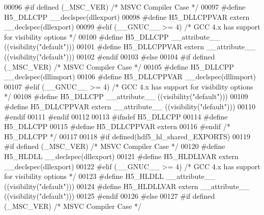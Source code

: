 \begin{DoxyCode}
00096 \textcolor{preprocessor}{  #if defined (\_MSC\_VER)  }\textcolor{comment}{/* MSVC Compiler Case */}\textcolor{preprocessor}{}
00097 \textcolor{preprocessor}{    #define H5\_DLLCPP \_\_declspec(dllexport)}
00098 \textcolor{preprocessor}{    #define H5\_DLLCPPVAR extern \_\_declspec(dllexport)}
00099 \textcolor{preprocessor}{  #elif (\_\_GNUC\_\_ >= 4)  }\textcolor{comment}{/* GCC 4.x has support for visibility options */}\textcolor{preprocessor}{}
00100 \textcolor{preprocessor}{    #define H5\_DLLCPP \_\_attribute\_\_ ((visibility("default")))}
00101 \textcolor{preprocessor}{    #define H5\_DLLCPPVAR extern \_\_attribute\_\_ ((visibility("default")))}
00102 \textcolor{preprocessor}{  #endif}
00103 \textcolor{preprocessor}{#else}
00104 \textcolor{preprocessor}{  #if defined (\_MSC\_VER)  }\textcolor{comment}{/* MSVC Compiler Case */}\textcolor{preprocessor}{}
00105 \textcolor{preprocessor}{    #define H5\_DLLCPP \_\_declspec(dllimport)}
00106 \textcolor{preprocessor}{    #define H5\_DLLCPPVAR \_\_declspec(dllimport)}
00107 \textcolor{preprocessor}{  #elif (\_\_GNUC\_\_ >= 4)  }\textcolor{comment}{/* GCC 4.x has support for visibility options */}\textcolor{preprocessor}{}
00108 \textcolor{preprocessor}{    #define H5\_DLLCPP \_\_attribute\_\_ ((visibility("default")))}
00109 \textcolor{preprocessor}{    #define H5\_DLLCPPVAR extern \_\_attribute\_\_ ((visibility("default")))}
00110 \textcolor{preprocessor}{  #endif}
00111 \textcolor{preprocessor}{#endif}
00112 
00113 \textcolor{preprocessor}{#ifndef H5\_DLLCPP}
00114 \textcolor{preprocessor}{  #define H5\_DLLCPP}
00115 \textcolor{preprocessor}{  #define H5\_DLLCPPVAR extern}
00116 \textcolor{preprocessor}{#endif }\textcolor{comment}{/* H5\_DLLCPP */}\textcolor{preprocessor}{}
00117 
00118 \textcolor{preprocessor}{#if defined(hdf5\_hl\_shared\_EXPORTS)}
00119 \textcolor{preprocessor}{  #if defined (\_MSC\_VER)  }\textcolor{comment}{/* MSVC Compiler Case */}\textcolor{preprocessor}{}
00120 \textcolor{preprocessor}{    #define H5\_HLDLL \_\_declspec(dllexport)}
00121 \textcolor{preprocessor}{    #define H5\_HLDLLVAR extern \_\_declspec(dllexport)}
00122 \textcolor{preprocessor}{  #elif (\_\_GNUC\_\_ >= 4)  }\textcolor{comment}{/* GCC 4.x has support for visibility options */}\textcolor{preprocessor}{}
00123 \textcolor{preprocessor}{    #define H5\_HLDLL \_\_attribute\_\_ ((visibility("default")))}
00124 \textcolor{preprocessor}{    #define H5\_HLDLLVAR extern \_\_attribute\_\_ ((visibility("default")))}
00125 \textcolor{preprocessor}{  #endif}
00126 \textcolor{preprocessor}{#else}
00127 \textcolor{preprocessor}{  #if defined (\_MSC\_VER)  }\textcolor{comment}{/* MSVC Compiler Case */}\textcolor{preprocessor}{}

\end{DoxyCode}
